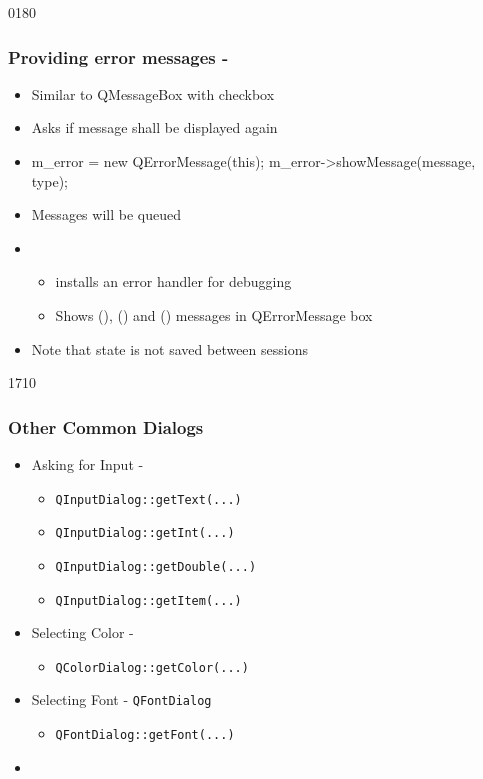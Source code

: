 \begin{slide}[fragile]{0180}\frametitle{Providing error messages - }\label{qerrormessage}
  \begin{itemize}
  \item Similar to QMessageBox with checkbox
  \item Asks if message shall be displayed again
 \item[]
    \begin{cpp}
m_error = new QErrorMessage(this);
m_error->showMessage(message, type);
    \end{cpp}
\item Messages will be queued
  \item {}
    \begin{itemize}
   \item installs an error handler for debugging
    \item Shows (), () and
    () messages in QErrorMessage box
    \end{itemize}
\item Note that state is not saved between sessions
\end{itemize}
\end{slide}

\begin{slide}{1710}
  \frametitle{Other Common Dialogs}
  \begin{itemize}
  \item Asking for Input - 
    \begin{itemize}
    \item \texttt{QInputDialog::getText(...)}
    \item \texttt{QInputDialog::getInt(...)}
    \item \texttt{QInputDialog::getDouble(...)}
    \item \texttt{QInputDialog::getItem(...)}
    \end{itemize}
  \item Selecting Color - 
    \begin{itemize}
    \item \texttt{QColorDialog::getColor(...)}
    \end{itemize}
  \item Selecting Font - \texttt{QFontDialog}
    \begin{itemize}
    \item \texttt{QFontDialog::getFont(...)}
    \end{itemize}
    
  \item {}
  \end{itemize}
\end{slide}


